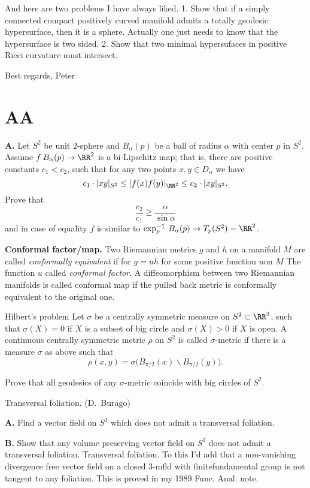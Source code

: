 And here are two problems I have always liked.
1. Show that if a
simply connected
compact positively curved manifold admits a totally geodesic hypersurface,
then it is a sphere. Actually one just needs to know that the hypersurface
is two sided.
2. Show that two minimal hypersufaces in positive Ricci curvature must
intersect.

Best regards, Peter








\chapter{AA}

{\bf A.} Let $S^2$ be unit $2$-sphere and
$B_\alpha(p)$ be a ball of
radius $\alpha$ with center $p$ in $S^2$.
Assume $f\:B_\alpha(p)\to \RR^2$ is a bi-Lipschitz map;
that is, there are positive constants $c_1 < c_2$, such that for any two points
$x,y\in D_\alpha$ we have
$$c_1\cdot |x y|_{S^2}\le |f(x)f(y)|_{\RR^2} \le c_2\cdot|x y|_{S^2}.$$
Prove that
$$\frac{c_2}{c_1}\ge \frac{\alpha}{\sin\alpha}$$
and in case of equality
$f$ is similar to $\exp_p^{-1}\:B_\alpha(p)\to T_p(S^2)=\RR^2$.

\item{\bf Conformal factor/map.} Two Riemannian metrics $g$ and $h$ on a manifold $M$ are called {\it conformally equivalent} if for $g=u h$ for some positive function $u$on $M$
The function $u$ called {\it conformal factor}.
A diffeomorphism between two Riemannian manifolds is called conformal map if the pulled back metric is conformally equivalent to the original one.

\begin{pr}{}{Hilbert's problem} Let $\sigma$ be a centrally
symmetric measure on $S^2\subset \RR^3$, such that $\sigma(X)=0$ if $X$ is a
subset of big circle and $\sigma(X)>0$ if $X$ is open.
A continuous centrally symmetric metric $\rho$ on $S^2$
is called $\sigma$-metric
if there is a measure $\sigma$ as above such that
$$\rho(x,y)=\sigma\bigl(B_{\pi/2}(x)\backslash B_{\pi/2}(y)\bigr).$$

Prove that all geodesics of any $\sigma$-metric coincide with big circles
of $S^2$.
\end{pr}

\begin{pr}{}
{Transversal foliation.} (D.~Burago)

{\bf A.} Find a vector field on $S^3$ which does not admit a transversal foliation.

{\bf B.} Show that any volume preserving vector field on $S^3$ does not admit a transversal foliation.
Transversal foliation. To this I'd add that a non-vanishing divergence free vector field on a closed 3-mfld with finitefundamental group is not tangent to any foliation. This is proved in my 1989 Func. Anal. note.
\end{pr}

